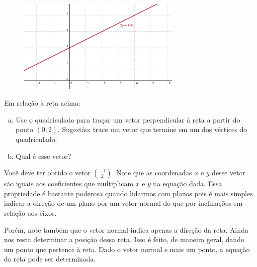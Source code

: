 \documentclass[main_estudante.tex]{subfiles}
\begin{document}
\begin{figure}[h]
\centering
\includegraphics[width=0.7\textwidth]{./img/c6q8.png}
\end{figure}

\begin{questao}
Em relação à reta acima:
\begin{enumerate}[a)]
\item Use o quadriculado para traçar um vetor perpendicular à reta a partir do ponto $(0;2)$. Sugestão: trace um vetor que termine em um dos vértices do quadriculado.
\item Qual é esse vetor?
\end{enumerate} 
\end{questao}

Você deve ter obtido o vetor $\binom{-1}{2}$. Note que as coordenadas $x$ e $y$ desse vetor são iguais aos coeficientes que multiplicam $x$ e $y$ na equação dada. Essa propriedade é bastante poderosa quando lidarmos com planos pois é mais simples indicar a direção de um plano por um vetor normal do que por inclinações em relação aos eixos.

Porém, note também que o vetor normal indica apenas a direção da reta. Ainda nos resta determinar a posição dessa reta. Isso é feito, de maneira geral, dando um ponto que pertence à reta. Dado o vetor normal e mais um ponto, a equação da reta pode ser determinada. 
\end{document}
